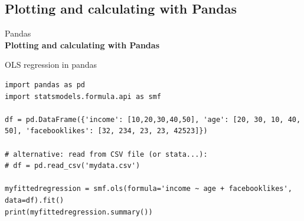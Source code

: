 \documentclass[handout]{beamer}
\begin{document}
\subsection{Plotting and calculating with Pandas}
\begin{frame}[plain]
	Pandas\\
	\textbf{Plotting and calculating with Pandas}
\end{frame}



\begin{frame}[fragile]{OLS regression in pandas}
\begin{lstlisting}
import pandas as pd
import statsmodels.formula.api as smf 

df = pd.DataFrame({'income': [10,20,30,40,50], 'age': [20, 30, 10, 40, 50], 'facebooklikes': [32, 234, 23, 23, 42523]})

# alternative: read from CSV file (or stata...):
# df = pd.read_csv('mydata.csv')

myfittedregression = smf.ols(formula='income ~ age + facebooklikes', data=df).fit()
print(myfittedregression.summary())
\end{lstlisting}
	
\end{frame}
\end{document}
